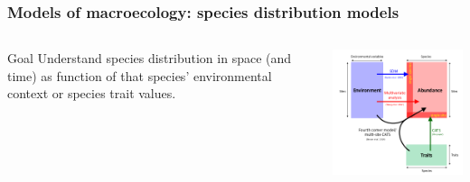 \documentclass{beamer}
\begin{document}
\begin{frame}
  \frametitle{Models of macroecology: species distribution models}

  \begin{columns}
    \begin{column}{0.5\textwidth}
      \begin{block}{Goal}
        Understand species distribution in space (and time) as function of that species' environmental context or species trait values.
      \end{block}
    \end{column}
    \begin{column}{0.5\textwidth}
      \begin{center}
        \includegraphics[width = \textwidth,height = 0.5\textheight,keepaspectratio = true]{figure/warton_corner_models}
      \end{center}
    \end{column}
  \end{columns}

  \tiny{}
\end{frame}
\end{document}
